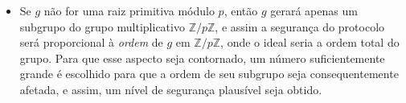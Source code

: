 \documentclass{article}
\begin{document}
\begin{itemize}
\item Se $g$ não for uma raiz primitiva módulo $p$, então $g$ gerará apenas um
subgrupo do grupo multiplicativo $\mathbb{Z}/p\mathbb{Z}$, e assim a segurança
do protocolo será proporcional à \emph{ordem} de $g$ em
$\mathbb{Z}/p\mathbb{Z}$, onde o ideal seria a ordem total do grupo. Para que
esse aspecto seja contornado, um número suficientemente grande é escolhido para
que a ordem de seu subgrupo seja consequentemente afetada, e assim, um nível de
segurança plausível seja obtido.

\end{itemize}



\end{document}
